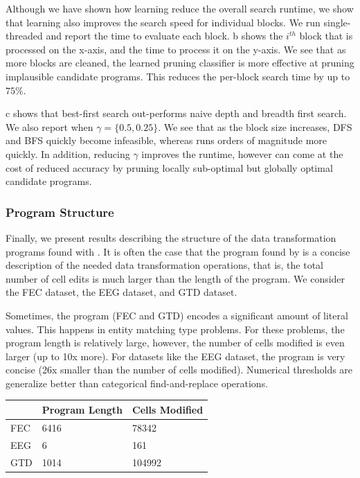  Although we have shown how learning reduce the overall search runtime, we show that learning also improves the search speed for individual blocks.  We run single-threaded \sys and report the time to evaluate each block.  b shows the $i^{th}$ block that is processed on the x-axis, and the time to process it on the y-axis.   We see that as more blocks are cleaned, the learned pruning classifier is more effective at pruning implausible candidate programs.  This reduces the per-block search time by up to $75\%$.  

 c shows that best-first search out-performs naive depth and breadth first search.  We also report \sys when $\gamma=\{0.5, 0.25\}$.  We see that as the block size increases, DFS and BFS quickly become infeasible, whereas \sys runs orders of magnitude more quickly.  In addition, reducing $\gamma$ improves the runtime, however can come at the cost of reduced accuracy by pruning locally sub-optimal but globally optimal candidate programs.  



\subsubsection{Program Structure}
Finally, we present results describing the structure of the data transformation programs found with \sys.
It is often the case that the program found by \sys is a concise description of the needed data transformation operations, that is, the total number of cell edits is much larger than the length of the program.
We consider the FEC dataset, the EEG dataset, and GTD dataset.

Sometimes, the program (FEC and GTD) encodes a significant amount of literal values. This happens in entity matching type problems. For these problems, the program length is relatively large, however, the number of cells modified is even larger (up to 10x more).
For datasets like the EEG dataset, the program is very concise (26x smaller than the number of cells modified).
Numerical thresholds are generalize better than categorical find-and-replace operations.

\begin{table}[ht!]
\centering
\label{my-label}
\begin{tabular}{|l|l|l|}
\hline
    & Program Length & Cells Modified \\ \hline \hline
FEC & 6416           & 78342          \\ \hline
EEG & 6              & 161            \\ \hline
GTD & 1014           & 104992 \\ \hline
\end{tabular}
\end{table}
